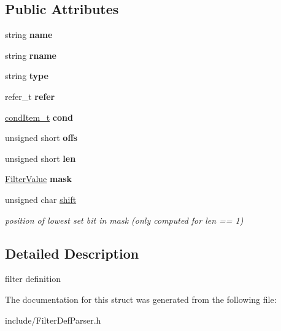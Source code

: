 \subsection*{Public Attributes}
\begin{DoxyCompactItemize}
\item 
\mbox{\label{structfilterDefItem__t_a53b83e74cf05841d193eba0458587300}} 
string {\bfseries name}
\item 
\mbox{\label{structfilterDefItem__t_a7df261baeb794a4e3af5d58292181e71}} 
string {\bfseries rname}
\item 
\mbox{\label{structfilterDefItem__t_a52e57501e1440c062ae27b2a5d829113}} 
string {\bfseries type}
\item 
\mbox{\label{structfilterDefItem__t_aa9af5e33efd8edf71e355f52c2327511}} 
refer\+\_\+t {\bfseries refer}
\item 
\mbox{\label{structfilterDefItem__t_a2ca1d76d1b4444ce7ea5ea8edb5ec241}} 
\hyperlink{structcondItem__t}{cond\+Item\+\_\+t} {\bfseries cond}
\item 
\mbox{\label{structfilterDefItem__t_a4b80c99e2ab8f379d9d8201fd1ca2bd0}} 
unsigned short {\bfseries offs}
\item 
\mbox{\label{structfilterDefItem__t_a628542cd24e504d019bb2239647db338}} 
unsigned short {\bfseries len}
\item 
\mbox{\label{structfilterDefItem__t_a1d9bb34646ad79c48e8d9f4a515cb16f}} 
\hyperlink{classFilterValue}{Filter\+Value} {\bfseries mask}
\item 
\mbox{\label{structfilterDefItem__t_abd3540baed1e4269a6d4a5367ce05735}} 
unsigned char \hyperlink{structfilterDefItem__t_abd3540baed1e4269a6d4a5367ce05735}{shift}
\begin{DoxyCompactList}\small\item\em position of lowest set bit in mask (only computed for len == 1) \end{DoxyCompactList}\end{DoxyCompactItemize}


\subsection{Detailed Description}
filter definition 

The documentation for this struct was generated from the following file\+:\begin{DoxyCompactItemize}
\item 
include/Filter\+Def\+Parser.\+h\end{DoxyCompactItemize}
